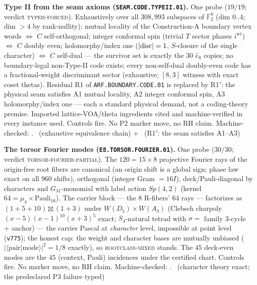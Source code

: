 \par\smallskip\noindent\textbf{Type II from the seam axioms
(\texttt{SEAM.CODE.TYPEII.01}).}
One probe ($19/19$; verdict \textsc{typeii-forced}).  Exhaustively
over all $308{,}993$ subspaces of $\mathbb F_2^8$ (dim $0..4$;
dim $>4$ by rank-nullity): mutual locality of the Construction-A
boundary vertex words $\iff$ $C$ self-orthogonal; integer conformal
spin (trivial $T$ sector phases $i^{\mathrm{wt}}$) $\iff$ $C$ doubly
even; holomorphy/index one ($|{\rm disc}|=1$, $S$-closure of the
single character) $\iff$ $C$ self-dual --- the survivor set is
exactly the $30$ $\hat e_8$ copies; no boundary-legal non-Type-II
code exists; every non-self-dual doubly-even code has a
fractional-weight discriminant sector (exhaustive; $[8,3]$ witness
with exact coset thetas).  Residual R1 of
\texttt{ARF.BOUNDARY.CODE.01} is replaced by R1$'$: the physical
seam satisfies A1 mutual locality, A2 integer conformal spin, A3
holomorphy/index one --- each a standard physical demand, not a
coding-theory premise.  Imported lattice-VOA/theta ingredients
cited and machine-verified in every instance used.  Controls fire.
No P2 marker move, no RH claim.
Machine-checked: .
\mE\ (exhaustive equivalence chain) $+$ \mC\ (R1$'$: the seam
satisfies A1--A3)
\par\smallskip

\par\smallskip\noindent\textbf{The torsor Fourier modes
(\texttt{E8.TORSOR.FOURIER.01}).}
One probe ($30/30$; verdict \textsc{torsor-fourier-partial}).  The
$120=15\times8$ projective Fourier rays of the origin-free root
fibers are canonical (an origin shift is a global sign; phase law
exact on all $960$ shifts), orthogonal (integer Gram $=16I$),
deck/Pauli-diagonal by characters and $G_{31}$-monomial with label
action $Sp(4,2)$ (kernel $64=\mu_4\times\mathrm{Pauli}_{16}$).  The
carrier block --- the $8$ R-fibers' $64$ rays --- factorizes as
$(1{+}5{+}10)\boxtimes(1{+}3)$ under $W(D_5)\times W(A_3)$ (Clebsch
charpoly $(x{-}5)(x{-}1)^{10}(x{+}3)^5$ exact; $S_4$-natural tetrad
with $\sigma=$ family 3-cycle $+$ anchor) --- the carrier Pascal at
\emph{character} level, impossible at point level
(\texttt{v775}); the honest cap: the weight and character bases are
mutually unbiased ($|\langle\text{pair}|\text{mode}\rangle|^2=1/8$
exactly), so \textsc{rootclass-mixed} stands.  The $45$ deck-even
modes are the $45$ (context, Pauli) incidences under the certified
chart.  Controls fire.  No marker move, no RH claim.
Machine-checked: .
\mE\ (character theory exact; the predeclared P3 failure typed)
\par\smallskip

